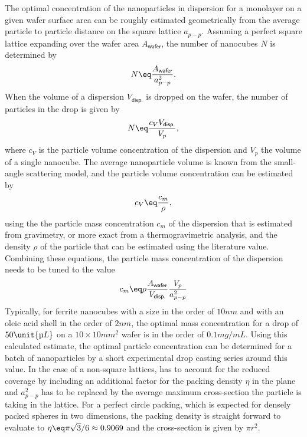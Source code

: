 \documentclass[\main/dresen_thesis.tex]{subfiles}
\begin{document}
  The optimal concentration of the nanoparticles in dispersion for a monolayer on a given wafer surface area can be roughly estimated geometrically from the average particle to particle distance on the square lattice $a_{p-p}$.
  Assuming a perfect square lattice expanding over the wafer area $A_{\textsf{wafer}}$, the number of nanocubes $N$ is determined by
  \begin{align}
    N \eq \frac{A_{\textsf{wafer}}}{a_{p-p}^2}.
  \end{align}
  When the volume of a dispersion $V_{\textsf{disp.}}$ is dropped on the wafer, the number of particles in the drop is given by
  \begin{align}
    N \eq \frac{c_V V_{\textsf{disp.}}}{V_p},
  \end{align}
  where $c_V$ is the particle volume concentration of the dispersion and $V_p$ the volume of a single nanocube.
  The average nanoparticle volume is known from the small-angle scattering model, and the particle volume concentration can be estimated by
  \begin{align}
    c_V \eq \frac{c_m}{\rho},
  \end{align}
  using the the particle mass concentration $c_m$ of the dispersion that is estimated from gravimetry, or more exact from a thermogravimetric analysis, and the density $\rho$ of the particle that can be estimated using the literature value.
  Combining these equations, the particle mass concentration of the dispersion needs to be tuned to the value
  \begin{align}\label{eq:monolayers:preparation:particleConcentration}
    c_m \eq \rho \frac{A_{\textsf{wafer}}}{V_{\textsf{disp.}}} \frac{V_p}{a_{p-p}^2}
  \end{align}
  Typically, for ferrite nanocubes with a size in the order of $10 \unit{nm}$ and with an oleic acid shell in the order of $2 \unit{nm}$, the optimal mass concentration for a drop of $50 \unit{\text{\textmu} L}$ on a $10\times 10 \unit{mm^2}$ wafer is in the order of $0.1 \unit{mg/mL}$.
  Using this calculated estimate, the optimal particle concentration can be determined for a batch of nanoparticles by a short experimental drop casting series around this value.
  In the case of a non-square lattices,  has to account for the reduced coverage by including an additional factor for the packing density $\eta$ in the plane and $a_{p-p}^2$ has to be replaced by the average maximum cross-section the particle is taking in the lattice.
  For a perfect circle packing, which is expected for densely packed spheres in two dimensions, the packing density is straight forward to evaluate to $\eta \eq \pi \sqrt{3} / 6 \approx 0.9069$ and the cross-section is given by $\pi r^2$.
\end{document}
